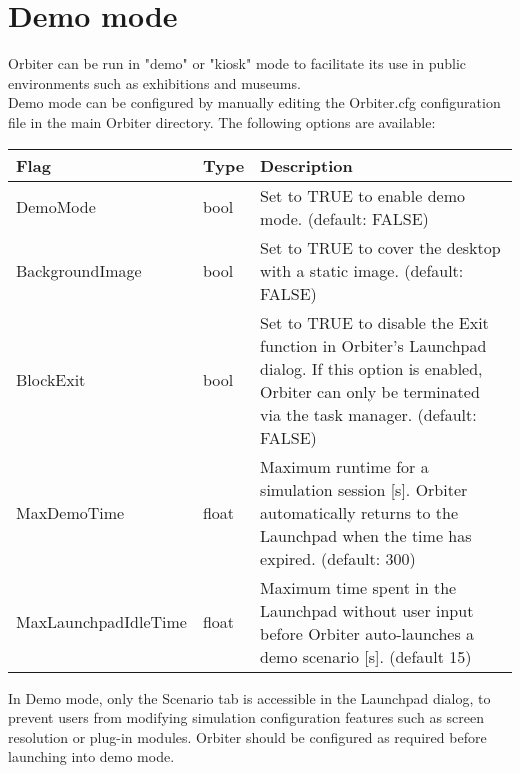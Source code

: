 \documentclass[Orbiter User Manual.tex]{subfiles}
\begin{document}
\section{Demo mode}
\label{sec:demo}
Orbiter can be run in "demo" or "kiosk" mode to facilitate its use in public environments such as exhibitions and museums.\\
Demo mode can be configured by manually editing the Orbiter.cfg configuration file in the main Orbiter directory. The following options are available:

	\begin{longtable}{ |p{}|p{}|p{}| }
	\hline\rule{0pt}{2ex}
	\textbf{Flag} & \textbf{Type} & \textbf{Description}\\
	\hline\rule{0pt}{2ex}
	DemoMode & bool & Set to TRUE to enable demo mode. (default: FALSE)\\
	\hline\rule{0pt}{2ex}
	BackgroundImage & bool & Set to TRUE to cover the desktop with a static image. (default: FALSE)\\
	\hline\rule{0pt}{2ex}
	BlockExit & bool & Set to TRUE to disable the Exit function in Orbiter's Launchpad dialog. If this option is enabled, Orbiter can only be terminated via the task manager. (default: FALSE)\\
	\hline\rule{0pt}{2ex}
	MaxDemoTime & float & Maximum runtime for a simulation session [s]. Orbiter automatically returns to the Launchpad when the time has expired. (default: 300)\\
	\hline\rule{0pt}{2ex}
	MaxLaunchpadIdleTime & float & Maximum time spent in the Launchpad without user input before Orbiter auto-launches a demo scenario [s]. (default 15)\\
	\hline
	\end{longtable}

\noindent
In Demo mode, only the Scenario tab is accessible in the Launchpad dialog, to prevent users from modifying simulation configuration features such as screen resolution or plug-in modules. Orbiter should be configured as required before launching into demo mode.\\


\end{document}
